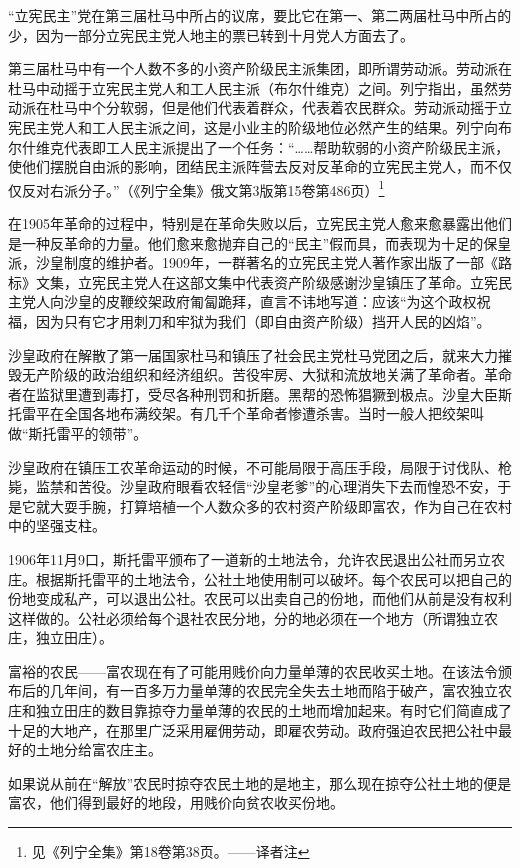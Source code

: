 “立宪民主”党在第三届杜马中所占的议席，要比它在第一、第二两届杜马中所占的少，因为一部分立宪民主党人地主的票已转到十月党人方面去了。

第三届杜马中有一个人数不多的小资产阶级民主派集团，即所谓劳动派。劳动派在杜马中动摇于立宪民主党人和工人民主派（布尔什维克）之间。列宁指出，虽然劳动派在杜马中个分软弱，但是他们代表着群众，代表着农民群众。劳动派动摇于立宪民主党人和工人民主派之间，这是小业主的阶级地位必然产生的结果。列宁向布尔什维克代表即工人民主派提出了一个任务：“……帮助软弱的小资产阶级民主派，使他们摆脱自由派的影响，团结民主派阵营去反对反革命的立宪民主党人，而不仅仅反对右派分子。”（《列宁全集》俄文第3版第15卷第486页）\footnote{见《列宁全集》第18卷第38页。——译者注}

在1905年革命的过程中，特别是在革命失败以后，立宪民主党人愈来愈暴露出他们是一种反革命的力量。他们愈来愈抛弃自己的“民主”假而具，而表现为十足的保皇派，沙皇制度的维护者。1909年，一群著名的立宪民主党人著作家出版了一部《路标》文集，立宪民主党人在这部文集中代表资产阶级感谢沙皇镇压了革命。立宪民主党人向沙皇的皮鞭绞架政府匍匐跪拜，直言不讳地写道：应该“为这个政权祝福，因为只有它才用刺刀和牢狱为我们（即自由资产阶级）挡开人民的凶焰”。

沙皇政府在解散了第一届国家杜马和镇压了社会民主党杜马党团之后，就来大力摧毁无产阶级的政治组织和经济组织。苦役牢房、大狱和流放地关满了革命者。革命者在监狱里遭到毒打，受尽各种刑罚和折磨。黑帮的恐怖猖獗到极点。沙皇大臣斯托雷平在全国各地布满绞架。有几千个革命者惨遭杀害。当时一般人把绞架叫做“斯托雷平的领带”。

沙皇政府在镇压工农革命运动的时候，不可能局限于高压手段，局限于讨伐队、枪毙，监禁和苦役。沙皇政府眼看农轻信“沙皇老爹”的心理消失下去而惶恐不安，于是它就大耍手腕，打算培植一个人数众多的农村资产阶级即富农，作为自己在农村中的坚强支柱。

1906年11月9口，斯托雷平颁布了一道新的土地法令，允许农民退出公社而另立农庄。根据斯托雷平的土地法令，公社土地使用制可以破坏。每个农民可以把自己的份地变成私产，可以退出公社。农民可以出卖自己的份地，而他们从前是没有权利这样做的。公社必须给每个退社农民分地，分的地必须在一个地方（所谓独立农庄，独立田庄）。

富裕的农民——富农现在有了可能用贱价向力量单薄的农民收买土地。在该法令颁布后的几年间，有一百多万力量单薄的农民完全失去土地而陷于破产，富农独立农庄和独立田庄的数目靠掠夺力量单薄的农民的土地而增加起来。有时它们简直成了十足的大地产，在那里广泛采用雇佣劳动，即雇农劳动。政府强迫农民把公社中最好的土地分给富农庄主。

如果说从前在“解放”农民时掠夺农民土地的是地主，那么现在掠夺公社土地的便是富农，他们得到最好的地段，用贱价向贫农收买份地。

